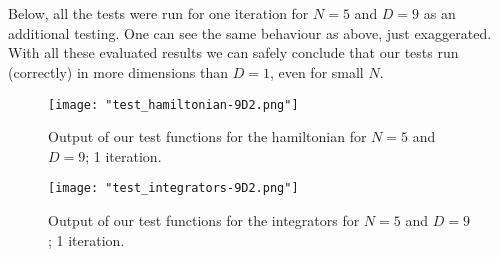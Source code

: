 \documentclass[11pt, letterpaper, onecolumn]{article}
\begin{document}
	\\
	\\
	Below, all the tests were run for one iteration for $N=5$ and $D=9$ as an additional testing. One can see the same behaviour as above, just exaggerated. \\
	With all these evaluated results we can safely conclude that our tests run (correctly) in more dimensions than $D=1$, even for small $N$.
	\begin{figure} [h] 
	\begin{center}
	\texttt{[image: "test\_hamiltonian-9D2.png"]}
	\caption{Output of our test functions for the hamiltonian for $N=5$ and $D=9$; 1 iteration.}
	\end{center}
	\end{figure}
	\begin{figure} [h] 
	\begin{center}
	\texttt{[image: "test\_integrators-9D2.png"]}
	\caption{Output of our test functions for the integrators for $N=5$ and $D=9$; 1 iteration.}
	\end{center}
	\end{figure}
	
	
	
	
	
	
	
\end{document}
